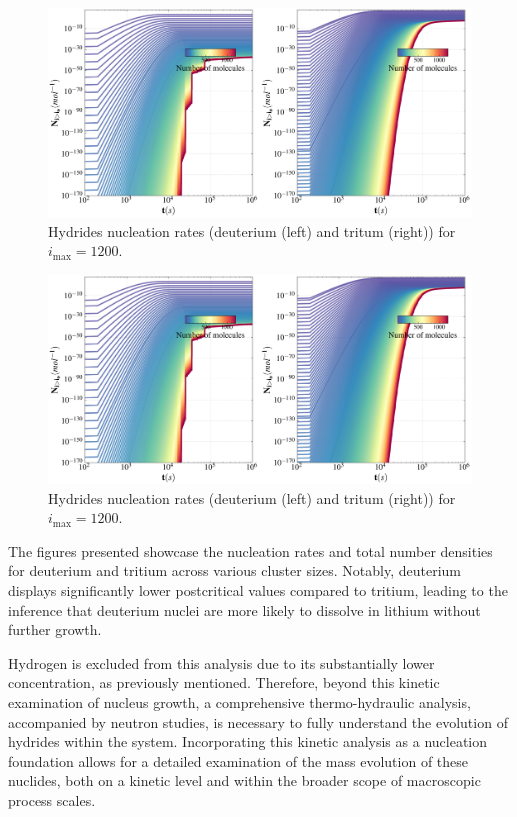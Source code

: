 \begin{figure}[H]
    \centering
    \includegraphics[width=1.1\linewidth]{rates_lid_lit.png}
    \caption{Hydrides nucleation rates (deuterium (left) and tritum (right)) for $i_{\text{max}} = 1200$.}
    \label{fig:psd_cr}
\end{figure}

\begin{figure}[H]
    \centering
    \includegraphics[width=1.1\linewidth]{number_lid_lit.png}
    \caption{Hydrides nucleation rates (deuterium (left) and tritum (right)) for $i_{\text{max}} = 1200$.}
    \label{fig:psd_cr}
\end{figure}

The figures presented showcase the nucleation rates and total number densities for deuterium and tritium across various cluster sizes. Notably, deuterium displays significantly lower postcritical values compared to tritium, leading to the inference that deuterium nuclei are more likely to dissolve in lithium without further growth.

Hydrogen is excluded from this analysis due to its substantially lower concentration, as previously mentioned. Therefore, beyond this kinetic 
examination of nucleus growth, a comprehensive thermo-hydraulic analysis, accompanied by neutron studies, is necessary to fully understand the 
evolution of hydrides within the system. Incorporating this kinetic analysis as a nucleation foundation allows for a detailed examination of 
the mass evolution of these nuclides, both on a kinetic level and within the broader scope of macroscopic process scales.

